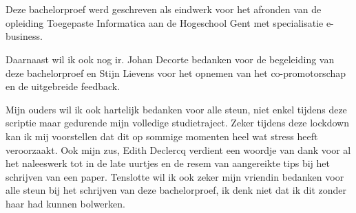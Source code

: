 
\chapter*{}
\label{ch:voorwoord}



Deze bachelorproef werd geschreven als eindwerk voor het afronden van de opleiding Toegepaste Informatica aan de Hogeschool Gent met specialisatie e-business.


Daarnaast wil ik ook nog ir. Johan Decorte bedanken voor de begeleiding van deze bachelorproef en Stijn Lievens voor het opnemen van het co-promotorschap en de uitgebreide feedback.

Mijn ouders wil ik ook hartelijk bedanken voor alle steun, niet enkel tijdens deze scriptie maar gedurende mijn volledige studietraject. Zeker tijdens deze lockdown kan ik mij voorstellen dat dit op sommige momenten heel wat stress heeft veroorzaakt.
Ook mijn zus, Edith Declercq verdient een woordje van dank voor al het naleeswerk tot in de late uurtjes en de resem van aangereikte tips bij het schrijven van een paper. 
Tenslotte wil ik ook zeker mijn vriendin bedanken voor alle steun bij het schrijven van deze bachelorproef, ik denk niet dat ik dit zonder haar had kunnen bolwerken.

 




